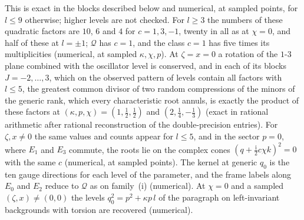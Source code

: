 This is exact in the blocks described below and numerical, at sampled points, for \(l\le9\) otherwise; higher levels are not checked. For \(l\ge3\) the numbers of these quadratic factors are \(10\), \(6\) and \(4\) for \(c=1,3,-1\), twenty in all as at \(\chi=0\), and half of these at \(l=\pm1\); \(\mathcal Q\) has \(c=1\), and the class \(c=1\) has five times its multiplicities (numerical, at sampled \(\kappa,\chi,p\)). At \(\zeta=x=0\) a rotation of the \(1\)-\(3\) plane combined with the oscillator level is conserved, and in each of its blocks \(J=-2,\dots,3\), which on the observed pattern of levels contain all factors with \(l\le5\), the greatest common divisor of two random compressions of the minors of the generic rank, which every characteristic root annuls, is exactly the product of these factors at \((\kappa,p,\chi)=(1,\tfrac12,\tfrac12)\) and \((2,\tfrac14,-\tfrac13)\) (exact in rational arithmetic after rational reconstruction of the double-precision entries). For \(\zeta,x\neq0\) the same values and counts appear for \(l\le5\), and in the sector \(p=0\), where \(E_1\) and \(E_3\) commute, the roots lie on the complex cones \((q+\tfrac{\mathrm i}2c\chi k)^2=0\) with the same \(c\) (numerical, at sampled points). The kernel at generic \(q_0\) is the ten gauge directions for each level of the parameter, and the frame labels along \(E_0\) and \(E_2\) reduce to \(\mathcal Q\) as on family~(i) (numerical). At \(\chi=0\) and a sampled \((\zeta,x)\neq(0,0)\) the levels \(q_0^2=p^2+\kappa p\,l\) of the paragraph on left-invariant backgrounds with torsion are recovered (numerical).

